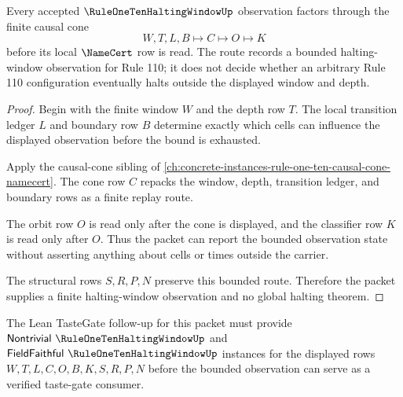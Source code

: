 \begin{theorem}
\label{thm:rule-one-ten-halting-window-causal-cone-route}
Every accepted $\RuleOneTenHaltingWindowUp$ observation factors through the finite causal cone
$$
W,T,L,B \longmapsto C \longmapsto O \longmapsto K
$$
before its local $\NameCert$ row is read. The route records a bounded halting-window observation for Rule 110; it does not decide whether an arbitrary Rule 110 configuration eventually halts outside the displayed window and depth.
\end{theorem}
\begin{proof}
Begin with the finite window $W$ and the depth row $T$. The local transition ledger $L$ and boundary row $B$ determine exactly which cells can influence the displayed observation before the bound is exhausted.

Apply the causal-cone sibling of \autoref{ch:concrete-instances-rule-one-ten-causal-cone-namecert}. The cone row $C$ repacks the window, depth, transition ledger, and boundary rows as a finite replay route.

The orbit row $O$ is read only after the cone is displayed, and the classifier row $K$ is read only after $O$. Thus the packet can report the bounded observation state without asserting anything about cells or times outside the carrier.

The structural rows $S,R,P,N$ preserve this bounded route. Therefore the packet supplies a finite halting-window observation and no global halting theorem.
\end{proof}



The Lean TasteGate follow-up for this packet must provide $\mathsf{Nontrivial}\ \RuleOneTenHaltingWindowUp$ and $\mathsf{FieldFaithful}\ \RuleOneTenHaltingWindowUp$ instances for the displayed rows $W,T,L,C,O,B,K,S,R,P,N$ before the bounded observation can serve as a verified taste-gate consumer.

